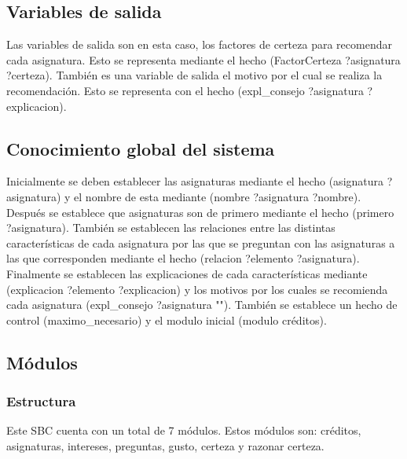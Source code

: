 \subsection{Variables de salida}
Las variables de salida son en esta caso, los factores de certeza para recomendar cada asignatura. Esto se representa mediante el hecho (FactorCerteza ?asignatura ?certeza). También es una variable de salida el motivo por el cual se realiza la recomendación. Esto se representa con el hecho (expl\_consejo ?asignatura ?explicacion).
\subsection{Conocimiento global del sistema}
Inicialmente se deben establecer las asignaturas mediante el hecho (asignatura ?asignatura) y el nombre de esta mediante (nombre ?asignatura ?nombre). Después se establece que asignaturas son de primero mediante el hecho (primero ?asignatura). También se establecen las relaciones entre las distintas características de cada asignatura por las que se preguntan con las asignaturas a las que corresponden mediante el hecho (relacion ?elemento ?asignatura). Finalmente se establecen las explicaciones de cada características mediante (explicacion ?elemento ?explicacion) y los motivos por los cuales se recomienda cada asignatura (expl\_consejo ?asignatura ""). También se establece un hecho de control (maximo\_necesario) y el modulo inicial (modulo créditos).
\subsection{Módulos}
\subsubsection{Estructura}
Este SBC cuenta con un total de 7 módulos. Estos módulos son: créditos, asignaturas, intereses, preguntas, gusto, certeza y razonar certeza.

